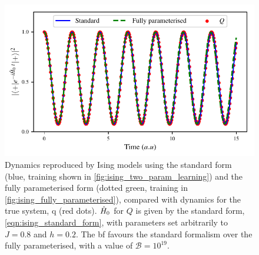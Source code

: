 \begin{figure}[t]
\begin{center}
    \includegraphics{theoretical_study/figures/dynamics.pdf}
\end{center}
\caption[Ising model forms' dynamics]{
    Dynamics reproduced by Ising models using the standard form (blue, training shown in \cref{fig:ising_two_param_learning}) 
    and the fully parameterised form (dotted green, training in \cref{fig:ising_fully_parameterised}), 
    compared with dynamics for the true system, \gls{q} (red dots).
    $\hat{H}_0$ for $Q$ is given by the standard form, \cref{eqn:ising_standard_form}, with parameters set arbitrarily to $J=0.8$ and $h=0.2$.
    The \acrlong{bf} favours the standard formalism over the fully parameterised, with  a value of $\mathcal{B}=10^{19}$.
    \figtableref
}
\label{fig:ising_model_types_dynamics}
\end{figure}


